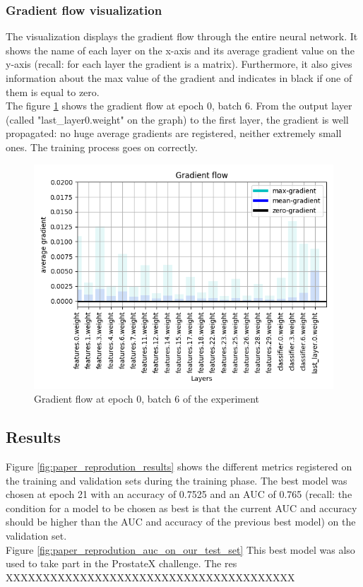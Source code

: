 \subsubsection{Gradient flow visualization}
The visualization displays the gradient flow through the entire neural network. It shows the name of each layer on the x-axis and its average gradient value on the y-axis (recall: for each layer the gradient is a matrix). Furthermore, it also gives information about the max value of the gradient and indicates in black if one of them is equal to zero.\\
The figure \ref{fig:gradient_flow} shows the gradient flow at epoch 0, batch 6. From the output layer (called "last\_layer0.weight" on the graph) to the first layer, the gradient is well propagated: no huge average gradients are registered, neither extremely small ones. The training process goes on correctly.

\begin{figure}[!h]
\centering
\includegraphics[width=1\textwidth, keepaspectratio=true]{./figures/gradient_flow.png}
\caption{Gradient flow at epoch 0, batch 6 of the experiment}
\label{fig:gradient_flow}
\end{figure}

\subsection{Results}
Figure \ref{fig:paper_reprodution_results} shows the different metrics registered on the training and validation sets during the training phase. The best model was chosen at epoch 21 with an accuracy of 0.7525 and an AUC of 0.765 (recall: the condition for a model to be chosen as best is that the current AUC and accuracy should be higher than the AUC and accuracy of the previous best model) on the validation set.\\
Figure \ref{fig:paper_reprodution_auc_on_our_test_set}
This best model was also used to take part in the ProstateX challenge. The res XXXXXXXXXXXXXXXXXXXXXXXXXXXXXXXXXXXXXXX

